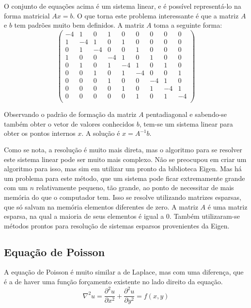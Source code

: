 \documentclass[journal]{IEEEtran}
\begin{document}
O conjunto de equações acima é um sistema linear, e é possível representá-lo na forma matricial $Ax = b$. O que torna este problema interessante é que a matriz $A$ e $b$ tem padrões muito bem definidos. A matriz $A$ toma a seguinte forma:
\[ \left( \begin{array}{ccccccccc}
-4 & 1 & 0 & 1 & 0 & 0 & 0 & 0 & 0 \\ %
1 & -4 & 1 & 0 & 1 & 0 & 0 & 0 & 0 \\ %
0 & 1 & -4 & 0 & 0 & 1 & 0 & 0 & 0 \\ %
1 & 0 & 0 & -4 & 1 & 0 & 1 & 0 & 0 \\ %
0 & 1 & 0 & 1 & -4 & 1 & 0 & 1 & 0 \\ %
0 & 0 & 1 & 0 & 1 & -4 & 0 & 0 & 1 \\ %
0 & 0 & 0 & 1 & 0 & 0 & -4 & 1 & 0 \\ %
0 & 0 & 0 & 0 & 1 & 0 & 1 & -4 & 1 \\ %
0 & 0 & 0 & 0 & 0 & 1 & 0 & 1 & -4 \\ %
\end{array} \right)\]

Observando o padrão de formação da matriz $A$ pentadiagonal e sabendo-se também obter o vetor de valores conhecidos $b$, tem-se um sistema linear para obter os pontos internos $x$. A solução é $x=A^{-1}b$.

Como se nota, a resolução é muito mais direta, mas o algoritmo para se resolver este sistema linear pode ser muito mais complexo. Não se preocupou em criar um algoritmo para isso, mas sim em utilizar um pronto da biblioteca Eigen. Mas há um problema para este método, que um sistema pode ficar extremamente grande com um $n$ relativamente pequeno, tão grande, ao ponto de necessitar de mais memória do que o computador tem. Isso se resolve utilizando matrizes esparsas, que só salvam na memória elementos diferentes de zero. A matriz $A$ é uma matriz esparsa, na qual a maioria de seus elementos é igual a 0. Também utilizaram-se métodos prontos para resolução de sistemas esparsos provenientes da Eigen.
\subsection{Equação de Poisson}

A equação de Poisson é muito similar a de Laplace, mas com uma diferença, que é a de haver uma função forçamento existente no lado direito da equação.
\begin{equation}
  \nabla^2 u=\frac{\partial^2 u}{\partial x^2}+\frac{\partial^2 u}{\partial y^2}=f(x,y)\label{poisson}
\end{equation}
\end{document}
